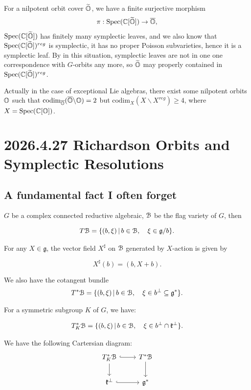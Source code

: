 \documentclass[12pt]{amsart}
\numberwithin{equation}{section}
\newcommand{\fg}{\mathfrak{g}} \newcommand{\fh}{\mathfrak{h}} \newcommand{\fk}{\mathfrak{k}}
\renewcommand{\bar}{\overline}
\renewcommand{\tilde}{\widetilde}
\newcommand{\set}[2]{\{#1\,|\,#2\}}
\begin{document}
\begin{rk}
  For a nilpotent orbit cover $\tilde{\BO}$, we have a finite surjective morphism
  \[
    \pi: \mathrm{Spec}(\BC[\tilde{\BO}]) \to \bar{\BO},
  \]
  $\mathrm{Spec}(\BC[\tilde{\BO}])$ has finitely many symplectic leaves, and we also know that $\mathrm{Spec}(\BC[\tilde{\BO}])^{reg}$ is symplectic, it has no proper Poisson subvarieties, hence it is a symplectic leaf. By in this situation, symplectic leaves are not in one one correspondence with $G$-orbits any more, so $\tilde{\BO}$ may properly contained in $\mathrm{Spec}(\BC[\tilde{\BO}])^{reg}$.

  Actually in the case of exceptional Lie algebras, there exist some nilpotent orbits ${\mathbb {O}}$ such that $\mathrm{codim}_{\bar{\BO}}(\bar{\BO} \backslash \BO) = 2$ but $\mathrm{codim}_{X}(X \backslash X^{reg}) \geq 4$, where $X = \mathrm{Spec}({\mathbb {C}}[{\mathbb {O}}])$.
\end{rk}


\section{2026.4.27 Richardson Orbits and Symplectic Resolutions}

\subsection{A fundamental fact I often forget}

$G$ be a complex connected reductive algebraic, ${\mathcal {B}}$ be the flag variety of $G$, then

\[
  T\CB = \set{(b,\xi)}{b \in \CB , \quad \xi \in \fg/b}.
\]

For any $X \in \fg$, the vector field $X^{\sharp}$ on ${\mathcal {B}}$ generated by $X$-action is given by

\[
  X^{\sharp}(b) = (b, X + b).
\]

We also have the cotangent bundle
\[
  T^*\CB = \set{(b, \xi)}{b \in \CB, \quad \xi \in b^{\perp} \subseteq \fg^*}.
\]

For a symmetric subgroup $K$ of $G$, we have:

\[
  T^*_{K} \CB = \set{(b, \xi)}{b \in \CB, \quad \xi \in b^{\perp} \cap \fk^{\perp}}.
\]

We have the following Cartersian diagram:
\[
  \begin{tikzcd}
    T^*_{K} \CB \arrow[r, hook] \arrow[d] & T^* \CB \arrow[d] \\
    \fk^{\perp} \arrow[r, hook] & \fg^*
  \end{tikzcd}
\]
\end{document}
